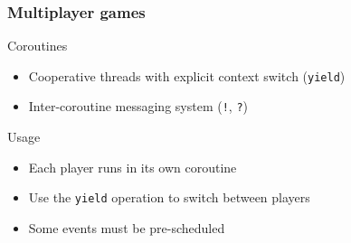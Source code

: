 \documentclass{beamer}
\newcommand{\<}[1]{\`#1}
\begin{document}
\begin{frame}
  \frametitle{Multiplayer games}

  \begin{block}{Coroutines}
    \begin{itemize}
    \item Cooperative threads with explicit context switch
      (\texttt{yield})
    \item Inter-coroutine messaging system (\texttt{!}, \texttt{?})
    \end{itemize}
  \end{block}

  \begin{block}{Usage}
    \begin{itemize}
    \item Each player runs in its own coroutine
    \item Use the \texttt{yield} operation to switch between players
    \item Some events must be pre-scheduled 
    \end{itemize}
  \end{block}
\end{frame}
\end{document}
